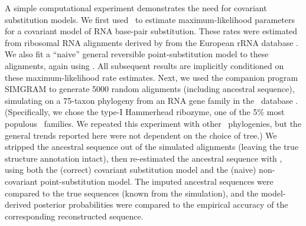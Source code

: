 \documentclass[10pt]{article}
\begin{document}
A simple computational experiment demonstrates the need for covariant substitution models.
We first used \xrate\ to estimate maximum-likelihood parameters for a covariant model of RNA base-pair substitution.
These rates were estimated from ribosomal RNA alignments
derived by \cite{DowellEddy2006} from the European rRNA database \cite{WuytsEtAl2004}.
We also fit a ``naive'' general reversible point-substitution model to these alignments, again using \xrate.
All subsequent results are implicitly conditioned on these maximum-likelihood rate estimates.
Next, we used the companion program SIMGRAM to generate 5000 random alignments (including ancestral sequence),
simulating on a 75-taxon phylogeny from an RNA gene family in the \RFAM\ database \cite{GriffithsJonesEtAl2003}.
(Specifically, we chose the type-I Hammerhead ribozyme, one of the 5\% most populous \RFAM\ families.
 We repeated this experiment with other \RFAM\ phylogenies, but the general trends reported here were not dependent on the choice of tree.)
We stripped the ancestral sequence out of the simulated alignments (leaving the true structure annotation intact),
then re-estimated the ancestral sequence with \xrate, using both the (correct) covariant substitution model and the (naive) non-covariant point-substitution model.
The imputed ancestral sequences were compared to the true sequences (known from the simulation),
and the model-derived posterior probabilities were compared to the empirical accuracy of the corresponding reconstructed sequence.
\end{document}
